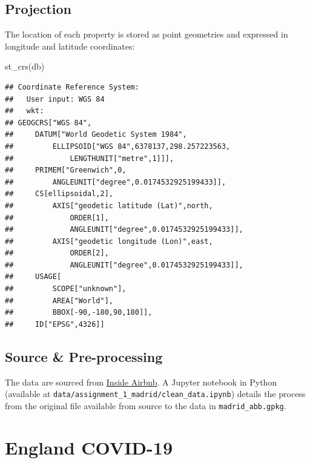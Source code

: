 \documentclass[
]{book}
\newenvironment{Shaded}{\begin{snugshade}}{\end{snugshade}}
\newcommand{\FunctionTok}[1]{\textcolor[rgb]{0.00,0.00,0.00}{#1}}
\newcommand{\NormalTok}[1]{#1}
\begin{document}
\hypertarget{projection}{%
\subsection*{Projection}\label{projection}}

The location of each property is stored as point geometries and expressed in longitude and latitude coordinates:

\begin{Shaded}
\begin{Highlighting}[]
\FunctionTok{st\_crs}\NormalTok{(db)}
\end{Highlighting}
\end{Shaded}

\begin{verbatim}
## Coordinate Reference System:
##   User input: WGS 84 
##   wkt:
## GEOGCRS["WGS 84",
##     DATUM["World Geodetic System 1984",
##         ELLIPSOID["WGS 84",6378137,298.257223563,
##             LENGTHUNIT["metre",1]]],
##     PRIMEM["Greenwich",0,
##         ANGLEUNIT["degree",0.0174532925199433]],
##     CS[ellipsoidal,2],
##         AXIS["geodetic latitude (Lat)",north,
##             ORDER[1],
##             ANGLEUNIT["degree",0.0174532925199433]],
##         AXIS["geodetic longitude (Lon)",east,
##             ORDER[2],
##             ANGLEUNIT["degree",0.0174532925199433]],
##     USAGE[
##         SCOPE["unknown"],
##         AREA["World"],
##         BBOX[-90,-180,90,180]],
##     ID["EPSG",4326]]
\end{verbatim}

\hypertarget{source-pre-processing}{%
\subsection*{Source \& Pre-processing}\label{source-pre-processing}}

The data are sourced from \href{http://insideairbnb.com/}{Inside Airbnb}. A Jupyter notebook in Python (available at \texttt{data/assignment\_1\_madrid/clean\_data.ipynb}) details the process from the original file available from source to the data in \texttt{madrid\_abb.gpkg}.

\hypertarget{england-covid-19}{%
\section{England COVID-19}\label{england-covid-19}}
\end{document}
